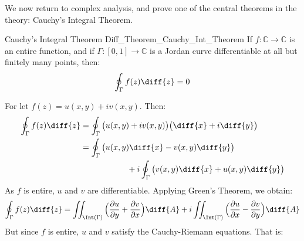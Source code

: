 \documentclass[crop=false,class=book,oneside]{standalone}
\begin{document}
            We now return to complex analysis, and prove one of the
            central theorems in the theory:
            Cauchy's Integral Theorem.
            \newpage
            \begin{ftheorem}{Cauchy's Integral Theorem}
                            {Diff_Theorem_Cauchy_Int_Theorem}
                If $f:\mathbb{C}\rightarrow\mathbb{C}$ is an
                entire function, and if
                $\Gamma:[0,1]\rightarrow\mathbb{C}$ is a
                Jordan curve differentiable at all but finitely
                many points, then:
                \begin{equation}
                    \oint_{\Gamma}f(z)\diff{z}=0
                \end{equation}
            \end{ftheorem}
            \begin{bproof}
                For let $f(z)=u(x,y)+iv(x,y)$. Then:
                \begin{subequations}
                    \begin{align}
                        \oint_{\Gamma}f(z)\diff{z}
                        &=\oint_{\Gamma}\big(u(x,y)+iv(x,y)\big)
                            \big(\diff{x}+i\diff{y}\big)\\
                        \nonumber&=\oint_{\Gamma}
                            \big(u(x,y)\diff{x}-v(x,y)\diff{y}\big)\\
                        &\hspace{2cm}+i\oint_{\Gamma}
                            \big(v(x,y)\diff{x}+u(x,y)\diff{y}\big)
                    \end{align}
                \end{subequations}
                As $f$ is entire, $u$ and $v$ are differentiable.
                Applying Green's Theorem, we obtain:
                \begin{equation}
                    \oint_{\Gamma}f(z)\diff{z}
                    =\iint_{\Int(\Gamma)}
                    \Big(\frac{\partial{u}}{\partial{y}}+
                         \frac{\partial{v}}{\partial{x}}\Big)
                         \diff{A}+
                    i\iint_{\Int(\Gamma)}
                    \Big(\frac{\partial{u}}{\partial{x}}-
                         \frac{\partial{v}}{\partial{y}}\Big)\diff{A}
                \end{equation}
                But since $f$ is entire, $u$ and $v$ satisfy
                the Cauchy-Riemann equations. That is:
                \par\hfill\par

\end{bproof}
\end{document}
